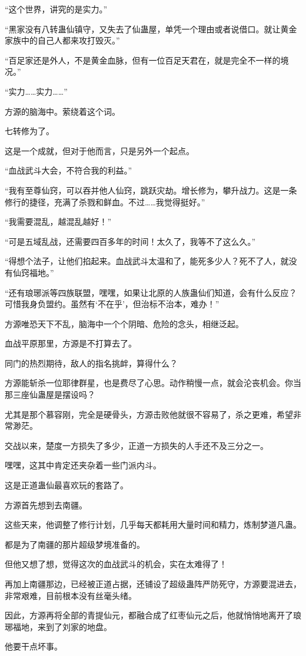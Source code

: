 \begin{this_body}
“这个世界，讲究的是实力。”

“黑家没有八转蛊仙镇守，又失去了仙蛊屋，单凭一个理由或者说借口。就让黄金家族中的自己人都来攻打毁灭。”

“百足家还是外人，不是黄金血脉，但有一位百足天君在，就是完全不一样的境况。”

“实力……实力……”

方源的脑海中。萦绕着这个词。

七转修为了。

这是一个成就，但对于他而言，只是另外一个起点。

“血战武斗大会，不符合我的利益。”

“我有至尊仙窍，可以吞并他人仙窍，跳跃灾劫。增长修为，攀升战力。这是一条修行的捷径，充满了杀戮和鲜血。不过……我觉得挺好。”

“我需要混乱，越混乱越好！”

“可是五域乱战，还需要四百多年的时间！太久了，我等不了这么久。”

“得想个法子，让他们掐起来。血战武斗太温和了，能死多少人？死不了人，就没有仙窍福地。”

“还有琅琊派等四族联盟，嘿嘿，如果让北原的人族蛊仙们知道，会有什么反应？可惜我身负盟约。虽然有‘不在乎’，但治标不治本，难办！”

方源唯恐天下不乱，脑海中一个个阴暗、危险的念头，相继泛起。

血战平原那里，方源是不打算去了。

同门的热烈期待，敌人的指名挑衅，算得什么？

方源能斩杀一位耶律群星，也是费尽了心思。动作稍慢一点，就会沦丧机会。你当那三座仙蛊屋是摆设吗？

尤其是那个慕容刚，完全是硬骨头，方源击败他就很不容易了，杀之更难，希望非常渺茫。

交战以来，楚度一方损失了多少，正道一方损失的人手还不及三分之一。

嘿嘿，这其中肯定还夹杂着一些门派内斗。

这是正道蛊仙最喜欢玩的套路了。

方源首先想到去南疆。

这些天来，他调整了修行计划，几乎每天都耗用大量时间和精力，炼制梦道凡蛊。

都是为了南疆的那片超级梦境准备的。

但他又想了想，觉得这次的血战武斗的机会，实在太难得了！

再加上南疆那边，已经被正道占据，还铺设了超级蛊阵严防死守，方源要混进去，非常艰难，目前根本没有丝毫头绪。

因此，方源再将全部的青提仙元，都融合成了红枣仙元之后，他就悄悄地离开了琅琊福地，来到了刘家的地盘。

他要干点坏事。

\end{this_body}

